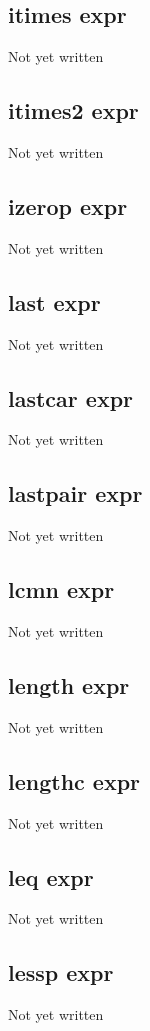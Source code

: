 \documentclass[a4paper,11pt]{article}
\begin{document}
{\subsection{\ttfamily itimes expr}
   Not yet written

\subsection{\ttfamily itimes2 expr}
   Not yet written

\subsection{\ttfamily izerop expr}
   Not yet written

\subsection{\ttfamily last expr}
   Not yet written

\subsection{\ttfamily lastcar expr}
   Not yet written

\subsection{\ttfamily lastpair expr}
   Not yet written

\subsection{\ttfamily lcmn expr}
   Not yet written

\subsection{\ttfamily length expr}
   Not yet written

\subsection{\ttfamily lengthc expr}
   Not yet written

\subsection{\ttfamily leq expr}
   Not yet written

\subsection{\ttfamily lessp expr}
   Not yet written

}
\end{document}
